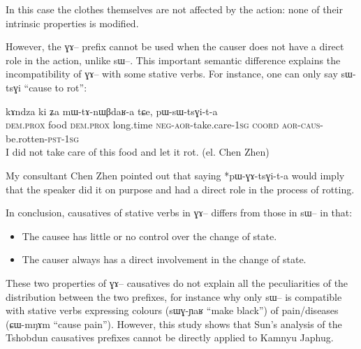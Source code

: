 \documentclass[oldfontcommands,oneside,a4paper,11pt]{memoir}
\newcommand{\ipa}[1]{{\phon #1}} %
\newcommand{\wav}[1]{}%
\newcommand{\aor}{\textsc{aor}}
\newcommand{\caus}{\textsc{caus}}
\newcommand{\coord}{\textsc{coord}}
\newcommand{\dem}{\textsc{dem}}
\newcommand{\emphat}{\textsc{emph}}
\newcommand{\inftv}{\textsc{inf}}
\newcommand{\negat}{\textsc{neg}}
\newcommand{\npst}{\textsc{n.pst}}
\newcommand{\poss}{\textsc{poss}}
\newcommand{\prox}{\textsc{prox}}
\newcommand{\pst}{\textsc{pst}}
\newcommand{\sg}{\textsc{sg}}
\begin{document}
     
In this case  the clothes themselves are not affected by the action: none of their intrinsic properties is modified.  



However, the \ipa{ɣɤ}-- prefix cannot be used when the causer does not have a direct role in the action, unlike \ipa{sɯ}--. This important semantic difference explains  the incompatibility of \ipa{ɣɤ}-- with some stative verbs. For instance, one can only say  \ipa{sɯ-tsɣi} ``cause to rot'':
     \begin{exe}
   \ex 
\gll \ipa{kɯki}  	\ipa{kɤndza}  	\ipa{ki}  	\ipa{ʑa}  	\ipa{mɯ-tɤ-nɯβdaʁ-a}  	\ipa{tɕe,}  	\ipa{pɯ-sɯ-tsɣi-t-a}    \\
   \dem{}.\prox{} food \dem{}.\prox{} long.time \negat{}-\aor{}-take.care-1\sg{} \coord{} \aor{}-\caus{}-be.rotten-\pst{}-1\sg{}  \\
 \glt  I did not take care of this food and let it rot.    (el. Chen Zhen) \wav{8_sWtsGi}
   \end{exe} 
My consultant Chen Zhen pointed out that saying *pɯ-ɣɤ-tsɣi-t-a would imply that the speaker did it on purpose and had a direct role in the process of rotting.
 

In conclusion, causatives of stative verbs in \ipa{ɣɤ}-- differs from those in \ipa{sɯ}--  in that:
\begin{itemize}
\item  The causee has little or no control over the change of state.
\item The causer always has a direct involvement in the change of state.
\end{itemize}
These two properties of \ipa{ɣɤ}-- causatives  do not explain all the peculiarities of the distribution between the two prefixes, for instance why only \ipa{sɯ}-- is compatible with  stative verbs expressing colours (\ipa{sɯɣ-ɲaʁ} ``make black'') of pain/diseases (\ipa{ɕɯ-mŋɤm} ``cause pain''). However, this study shows that Sun's analysis of the Tshobdun causatives prefixes cannot be directly applied to Kamnyu Japhug.
 
\end{document}
